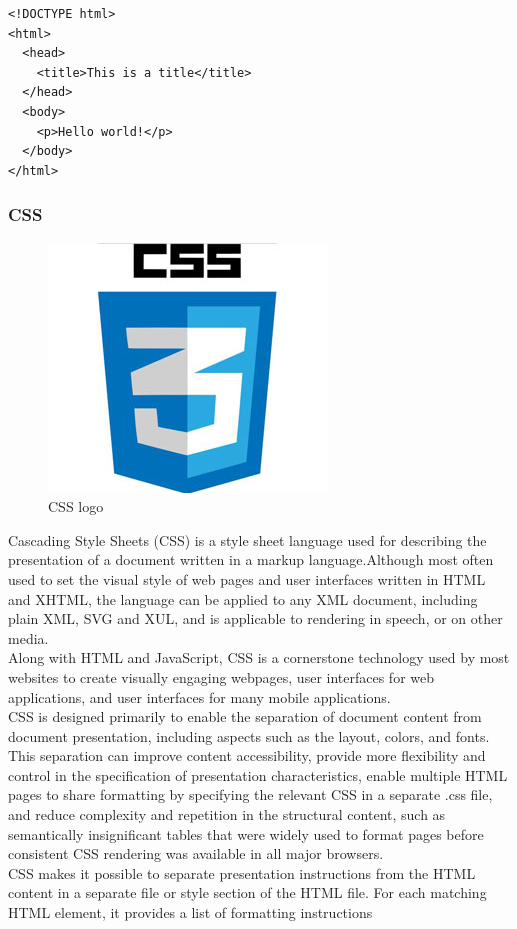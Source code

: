 \begin{verbatim}
<!DOCTYPE html>
<html>
  <head>
    <title>This is a title</title>
  </head>
  <body>
    <p>Hello world!</p>
  </body>
</html>

\end{verbatim}


\subsubsection{CSS}

\begin{figure}[h!]
\centering \includegraphics[scale=0.50]{input/images/CSS.jpg}
\caption{CSS logo}
\end{figure}
Cascading Style Sheets (CSS) is a style sheet language used for describing the presentation of a document written in a markup language.Although most often used to set the visual style of web pages and user interfaces written in HTML and XHTML, the language can be applied to any XML document, including plain XML, SVG and XUL, and is applicable to rendering in speech, or on other media. \\
Along with HTML and JavaScript, CSS is a cornerstone technology used by most websites to create visually engaging webpages, user interfaces for web applications, and user interfaces for many mobile applications.\\
CSS is designed primarily to enable the separation of document content from document presentation, including aspects such as the layout, colors, and fonts.\\
 This separation can improve content accessibility, provide more flexibility and control in the specification of presentation characteristics, enable multiple HTML pages to share formatting by specifying the relevant CSS in a separate .css file, and reduce complexity and repetition in the structural content, such as semantically insignificant tables that were widely used to format pages before consistent CSS rendering was available in all major browsers.\\
 CSS makes it possible to separate presentation instructions from the HTML content in a separate file or style section of the HTML file. For each matching HTML element, it provides a list of formatting instructions

